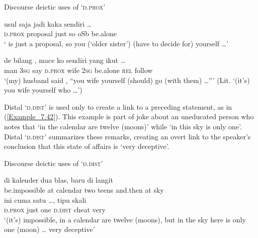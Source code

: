 {\begin{styleExampleTitle}
Discourse deictic uses of  ‘\textsc{d.prox}’
\end{styleExampleTitle}

\ea
\label{Example_7.40}
\gll {\ldots} {} {usul} {saja} {jadi} {kaka} {sendiri} {\ldots}\\ %
  { }   \textsc{d.prox}  proposal  just  so  oSb  be.alone  \\
\glt ‘ is just a proposal, so you (‘older sister’) (have to decide for) yourself \ldots’ \textstyleExampleSource{[080917-010-CvEx.0116]}
\z

\ea
\label{Example_7.41}
 {de} {bilang} {,} {mace} {ko} {sendiri} {yang} {ikut} {\ldots}\\ %
 man  \textsc{3sg}  say  \textsc{d.prox}  wife  \textsc{2sg}  be.alone  \textsc{rel}  follow  \\
\glt 
‘(my) husband said , ``you wife yourself (should) go (with them) \ldots''' (Lit. ‘(it’s) you wife yourself who \ldots’) \textstyleExampleSource{[081025-009a-Cv.0032]}
\z



Distal  ‘\textsc{d.dist}’ is used only to create a link to a preceding statement, as in (\ref{Example_7.42}). This example is part of joke about an uneducated person who notes that  ‘in the calendar are twelve (moons)’ while  ‘in this sky is only one’. Distal  ‘\textsc{d.dist}’ summarizes these remarks, creating an overt link to the speaker’s conclusion that this state of affairs is  ‘very deceptive’.


\begin{styleExampleTitle}
Discourse deictic uses of  ‘\textsc{d.dist}’
\end{styleExampleTitle}

\ea
\label{Example_7.42}
 {{di}} {{kalender}} {{dua}} {{blas,}} {baru} {di} {langit}\\ %
 {be.impossible}  {at}  {calendar}  {two}  {teens}  and.then  at  sky\\
\gll ini  {cuma}  {satu}  {\ldots,}  {}  {tipu}  {skali}\\
 \textsc{d.prox}  {just}  {one}  { }   {\textsc{d.dist}}  {cheat}  {very}\\
\glt [Joke:] ‘(it’s) impossible, in a calendar are twelve (moons), but in the sky here is only one (moon) {\ldots}  very deceptive’ \textstyleExampleSource{[081109-007-JR.0003]}
\z



}

